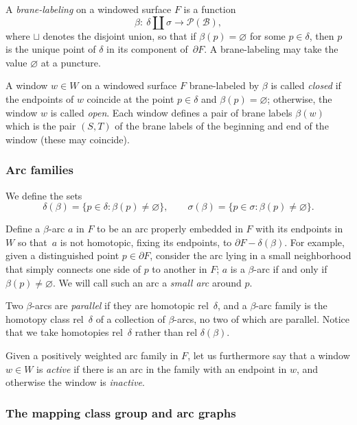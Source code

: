 \documentclass[11pt]{article}
\begin{document}
A {\it brane-labeling} on a windowed surface $F$ is a function
\[
\beta : \ \delta\coprod\sigma\to{\mathcal P}({\mathcal B}),
\]
where $\sqcup$ denotes the disjoint union, so that if $\beta
(p)=\varnothing$ for some $p\in\delta$, then $p$ is the unique point
of $\delta$ in its component of~$\partial F$.  A brane-labeling
may take the value $\varnothing$ at a puncture.



A window $w\in W$ on a windowed surface $F$ brane-labeled by
$\beta$ is called {\it closed} if the endpoints of $w$ coincide at
the point $p\in\delta$ and $\beta (p)=\varnothing$; otherwise, the
window $w$ is called {\it open}.
Each window def\/ines a pair of brane labels $\beta(w)$ which is
the pair $(S,T)$ of the brane labels of the beginning and end of the window (these
may coincide).

\subsubsection{Arc families}

We def\/ine the sets
\[
\delta
(\beta )=\{ p\in\delta :\beta (p)\neq\varnothing\},\qquad \sigma
(\beta )=\{ p\in\sigma :\beta (p)\neq\varnothing\} .
\]


Def\/ine a $\beta$-arc $a$ in $F$ to be an arc properly embedded in $F$ with its endpoints in $W$ so that~$a$ is not
homotopic, f\/ixing its endpoints, to $\partial F-\delta (\beta )$.  For example, given a distinguished point
$p\in\partial
F$, consider the arc lying in a small neighborhood that simply connects one side of $p$ to another in $F$; $a$ is
a $\beta$-arc if and only if
$\beta (p)\neq\varnothing$. We will call such an arc a {\it small arc} around $p$.

Two $\beta$-arcs are {\it parallel} if they are homotopic rel~$\delta$, and a $\beta$-arc family is the homotopy
class
rel~$\delta$ of a collection of $\beta$-arcs, no two of which are parallel.  Notice that we take homotopies rel~$\delta$
rather than
rel $\delta (\beta )$.





Given a positively weighted arc family in $F$, let us furthermore say that a window $w\in W$ is {\it active}
if there
is an arc in the family with an endpoint in $w$, and otherwise the window is {\it inactive}.



\subsubsection{The mapping class group and arc graphs}
\end{document}
